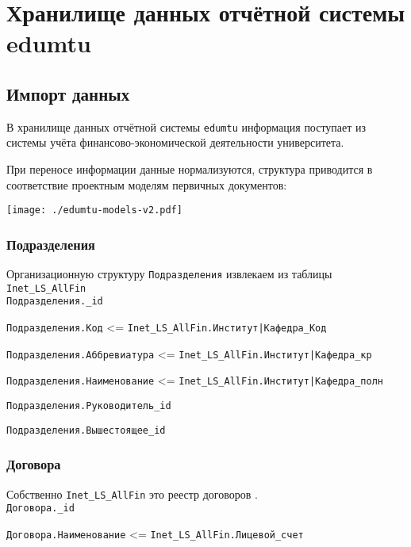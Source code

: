 \documentclass[12pt,a4paper]{scrartcl}
\begin{document}
\linespread{1.3}%
\selectfont %

\section*{Хранилище данных отчётной системы edumtu}

\subsection*{Импорт данных}

В хранилище данных отчётной системы \texttt{edumtu} информация поступает из системы учёта финансово-экономической деятельности университета. 

При переносе информации данные нормализуются, структура приводится в соответствие проектным моделям первичных документов:

\texttt{[image: ./edumtu-models-v2.pdf]}  %


\subsubsection*{Подразделения}

Организационную структуру \texttt{Подразделения} извлекаем из таблицы \texttt{Inet\_LS\_AllFin}\\

\texttt{Подразделения.\_id}

\texttt{Подразделения.Код} <= \texttt{Inet\_LS\_AllFin.Институт|Кафедра\_Код}

\texttt{Подразделения.Аббревиатура} <= \texttt{Inet\_LS\_AllFin.Институт|Кафедра\_кр}

\texttt{Подразделения.Наименование} <= \texttt{Inet\_LS\_AllFin.Институт|Кафедра\_полн}

\texttt{Подразделения.Руководитель\_id}

\texttt{Подразделения.Вышестоящее\_id}


\subsubsection*{Договора}

Собственно \texttt{Inet\_LS\_AllFin} это реестр договоров .\\

\texttt{Договора.\_id}

\texttt{Договора.Наименование} <= \texttt{Inet\_LS\_AllFin.Лицевой\_счет}
\end{document}
